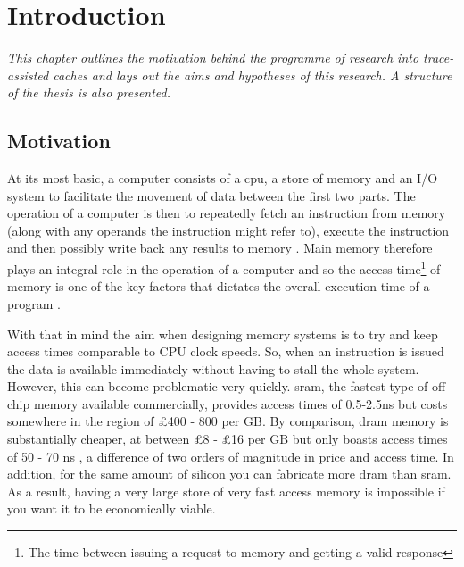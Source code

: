 \chapter{Introduction}
\label{chap:introduction}

\emph{This chapter outlines the motivation behind the programme of research into trace-assisted caches and lays out the aims and hypotheses of this research. A structure of the thesis is also presented.}

\section{Motivation}


At its most basic, a computer consists of a \gls{cpu}, a store of memory and an I/O system to facilitate the movement of data between the first two parts. The operation of a computer is then to repeatedly fetch an instruction from memory (along with any operands the instruction might refer to), execute the instruction and then possibly write back any results to memory \cite{przybylskiCacheMemoryHierarchy1990}. Main memory therefore plays an integral role in the operation of a computer and so the access time\footnote{The time between issuing a request to memory and getting a valid response} of memory is one of the key factors that dictates the overall execution time of a program \cite{pattersonComputerOrganizationDesign2018, pattersonCaseIntelligentRAM1997}. 

With that in mind the aim when designing memory systems is to try and keep access times comparable to CPU clock speeds. So, when an instruction is issued the data is available immediately without having to stall the whole system. However, this can become problematic very quickly. \gls{sram}, the fastest type of off-chip memory available commercially, provides access times of 0.5-2.5ns but costs somewhere in the region of £400 - 800 per GB. By comparison, \gls{dram} memory is substantially cheaper, at between £8 - £16 per GB but only boasts access times of 50 - 70 ns \cite{pattersonComputerOrganizationDesign2018}, a difference of two orders of magnitude in price and access time. In addition, for the same amount of silicon you can fabricate more \gls{dram} than \gls{sram}. As a result, having a very large store of very fast access memory is impossible if you want it to be economically viable.

